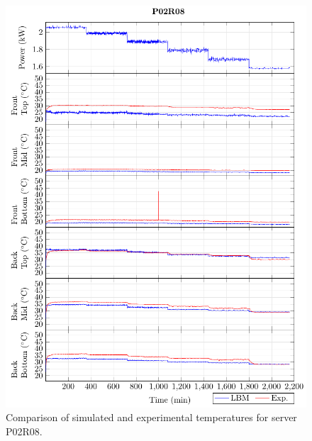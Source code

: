 \begin{figure}[!htb]
\centering
\includegraphics[width=\linewidth]{Plots/P02R08_T.pdf}
\caption{Comparison of simulated and experimental temperatures for server P02R08.}
\label{fig:P02R08_plot}
\end{figure}

\clearpage

